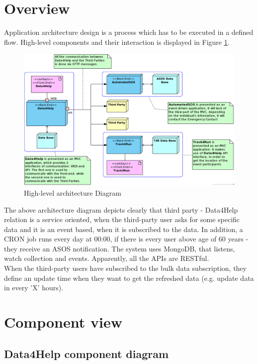 \documentclass[a4paper, hidelinks, 12pt]{report}
\begin{document}
	\section{Overview}
	\label{sec:overview}
	Application architecture design is a process which has to be executed in a defined flow. High-level components and their interaction is displayed in Figure \ref{fig:High-level architecture Diagram}.
	\begin{figure}[H]
		\centering
		\includegraphics[width=1\textwidth]{diagrams/architecture.png}
		\caption[High-level architecture Diagram]{High-level architecture Diagram}
		\label{fig:High-level architecture Diagram}
	\end{figure}
			
The above architecture diagram depicts clearly that third party - Data4Help relation is a service oriented, when the third-party user asks for some specific data and it is an event based, when it is subscribed to the data. In addition, a CRON job runs every day at 00:00, if there is every user above age of 60 years - they receive an ASOS notification. The system uses MongoDB, that listens, watch collection and events. Apparently, all the APIs are RESTful.\\

When the third-party users have subscribed to the bulk data subscription, they define an update time when they want to get the refreshed data (e.g. update data in every 'X' hours).

	\section{Component view}
		\subsection{Data4Help component diagram}
\end{document}
